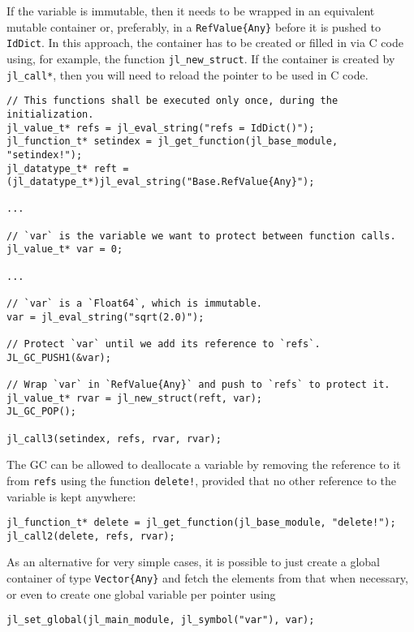 If the variable is immutable, then it needs to be wrapped in an equivalent mutable container or, preferably, in a \texttt{RefValue\{Any\}} before it is pushed to \texttt{IdDict}. In this approach, the container has to be created or filled in via C code using, for example, the function \texttt{jl\_new\_struct}. If the container is created by \texttt{jl\_call*}, then you will need to reload the pointer to be used in C code.




\begin{lstlisting}
// This functions shall be executed only once, during the initialization.
jl_value_t* refs = jl_eval_string("refs = IdDict()");
jl_function_t* setindex = jl_get_function(jl_base_module, "setindex!");
jl_datatype_t* reft = (jl_datatype_t*)jl_eval_string("Base.RefValue{Any}");

...

// `var` is the variable we want to protect between function calls.
jl_value_t* var = 0;

...

// `var` is a `Float64`, which is immutable.
var = jl_eval_string("sqrt(2.0)");

// Protect `var` until we add its reference to `refs`.
JL_GC_PUSH1(&var);

// Wrap `var` in `RefValue{Any}` and push to `refs` to protect it.
jl_value_t* rvar = jl_new_struct(reft, var);
JL_GC_POP();

jl_call3(setindex, refs, rvar, rvar);
\end{lstlisting}



The GC can be allowed to deallocate a variable by removing the reference to it from \texttt{refs} using the function \texttt{delete!}, provided that no other reference to the variable is kept anywhere:




\begin{lstlisting}
jl_function_t* delete = jl_get_function(jl_base_module, "delete!");
jl_call2(delete, refs, rvar);
\end{lstlisting}



As an alternative for very simple cases, it is possible to just create a global container of type \texttt{Vector\{Any\}} and fetch the elements from that when necessary, or even to create one global variable per pointer using




\begin{lstlisting}
jl_set_global(jl_main_module, jl_symbol("var"), var);
\end{lstlisting}



